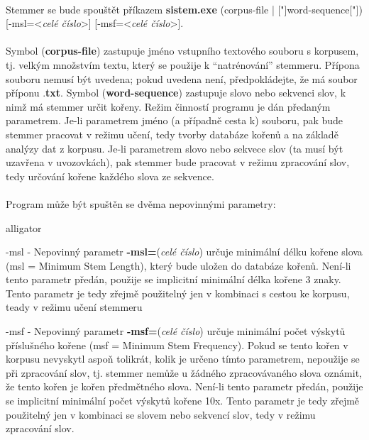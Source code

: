 ﻿\documentclass[12pt, a4paper]{article}
\begin{document}
\paragraph{}
Stemmer se bude spouštět příkazem \textbf{sistem.exe} (corpus-file | ["]word-sequence["]) [-msl=<\textit{celé číslo}>] [-msf=<\textit{celé číslo}>].

\paragraph{}
Symbol (\textbf{corpus-file}) zastupuje jméno vstupního textového souboru s korpusem, tj. velkým množstvím textu, který se použije k "`natrénování"'  stemmeru. Přípona souboru nemusí být uvedena; pokud uvedena není, předpokládejte, že má soubor příponu .\textbf{txt}. Symbol (\textbf{word-sequence}) zastupuje slovo nebo sekvenci slov, k nimž má stemmer určit kořeny. Režim činností programu je dán předaným parametrem. Je-li parametrem jméno (a případně cesta k) souboru, pak bude stemmer pracovat v režimu učení, tedy tvorby databáze kořenů a na základě analýzy dat z korpusu. Je-li parametrem slovo nebo sekvece slov (ta musí být uzavřena v uvozovkách), pak stemmer bude pracovat v režimu zpracování slov, tedy určování kořene každého slova ze sekvence.

\paragraph{}
Program může být spuštěn se dvěma nepovinnými parametry:

\begin{labeling}{alligator}
\item [-msl] - Nepovinný parametr \textbf{-msl=}(\textit{celé číslo}) určuje minimální délku kořene slova (msl = Minimum Stem Length), který bude uložen do databáze kořenů. Není-li tento parametr předán, použije se implicitní minimální délka kořene 3 znaky. Tento parametr je tedy zřejmě použitelný jen v kombinaci s cestou ke korpusu, teady v režimu učení stemmeru
\item [-msf] - Nepovinný parametr \textbf{-msf=}(\textit{celé číslo}) určuje minimální počet výskytů příslušného kořene (msf = Minimum Stem Frequency). Pokud se tento kořen v korpusu nevyskytl aspoň tolikrát, kolik je určeno tímto parametrem, nepoužije se při zpracování slov, tj. stemmer nemůže u žádného zpracovávaného slova oznámit, že tento kořen je kořen předmětného slova. Není-li tento parametr předán, použije se implicitní minimální počet výskytů kořene 10x. Tento parametr je tedy zřejmě použitelný jen v kombinaci se slovem nebo sekvencí slov, tedy v režimu zpracování slov.
\end{labeling}
\end{document}
